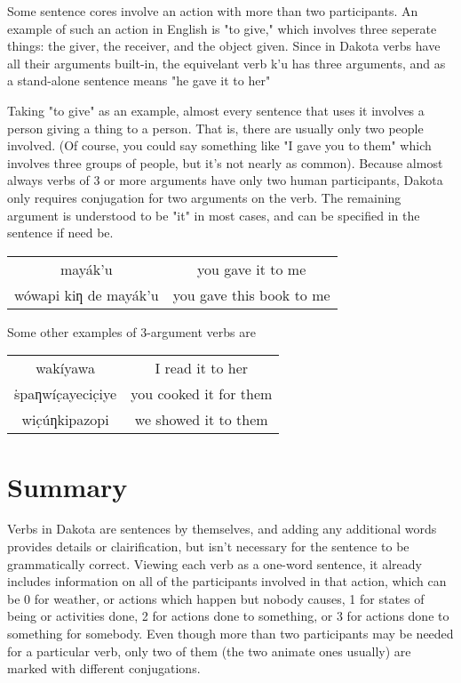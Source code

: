 \documentclass[10pt,letter]{article}
\newcommand\dak[1]{{\dakota #1}}
\newenvironment{BilingCol}
{\begin{center}\begin{tabular}{>{\dakota}c>{}c}

}
{\end{tabular}\end{center}}
\begin{document}
Some sentence cores involve an action with more than two participants.  An example of such an action in English is "to give," which involves three seperate things: the giver, the receiver, and the object given.  Since in Dakota verbs have all their arguments built-in, the equivelant verb \dak{ k’u} has three arguments, and as a stand-alone sentence means "he gave it to her"


Taking "to give" as an example, almost every sentence that uses it involves a person giving a thing to a person.  That is, there are usually only two people involved.  (Of course, you could say something like "I gave you to them" which involves three groups of people, but it's not nearly as common).  Because almost always verbs of 3 or more arguments have only two human participants, Dakota only requires conjugation for two arguments on the verb.  The remaining argument is understood to be "it" in most cases, and can be specified in the sentence if need be.

\begin{BilingCol}
mayák’u &you gave it to me \\
wówapi kiƞ de mayák’u & you gave this book to me
\end{BilingCol}

Some other examples of 3-argument verbs are

\begin{BilingCol}
 wakíyawa & I read it to her \\
ṡpaƞwíc̣ayecic̣iye & you cooked it for them\\
 wic̣úƞkipazopi& we showed it to them
\end{BilingCol}


\section{Summary}
Verbs in Dakota are sentences by themselves, and adding any additional words provides details or clairification, but isn't necessary for the sentence to be grammatically correct.  Viewing each verb as a one-word sentence, it already includes information on all of the participants involved in that action, which can be 0 for weather, or actions which happen but nobody causes, 1 for states of being or activities done, 2 for actions done to something, or 3 for actions done to something for somebody.  Even though more than two participants may be needed for a particular verb, only two of them (the two animate ones usually) are marked with different conjugations.

    \nocite{*}
    
    
\end{document}
